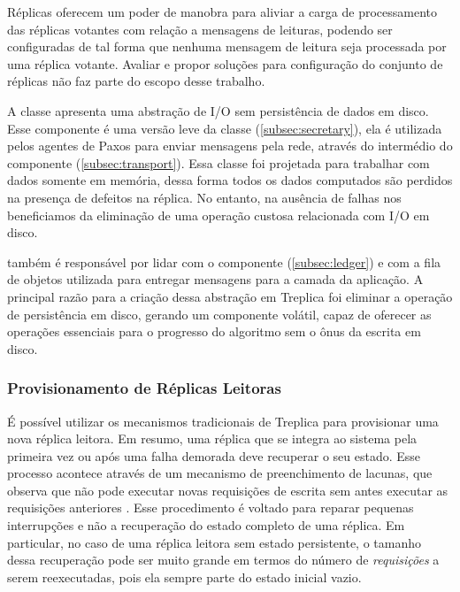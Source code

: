 Réplicas oferecem um poder de manobra para aliviar a carga de processamento das réplicas
votantes com relação a mensagens de leituras, podendo ser configuradas de tal forma que
nenhuma mensagem de leitura seja processada por uma réplica votante. Avaliar e propor
soluções para configuração do conjunto de réplicas não faz parte do escopo desse trabalho.


A classe  apresenta uma abstração de I/O sem persistência de
dados em disco. Esse componente é uma versão leve da classe 
(\autoref{subsec:secretary}), ela é utilizada pelos agentes de Paxos para enviar mensagens
pela rede, através do intermédio do componente 
(\autoref{subsec:transport}). Essa classe foi projetada para trabalhar com dados somente
em memória, dessa forma todos os dados computados são perdidos na presença de defeitos na
réplica. No entanto, na ausência de falhas nos beneficiamos da eliminação de uma operação
custosa relacionada com I/O em disco.

 também é responsável por lidar com o componente
 (\autoref{subsec:ledger}) e com a fila de objetos utilizada
para entregar mensagens para a camada da aplicação. A principal razão para a criação dessa
abstração em Treplica foi eliminar a operação de persistência em disco, gerando um
componente volátil, capaz de oferecer as operações essenciais para o progresso do
algoritmo sem o ônus da escrita em disco.

\subsubsection{Provisionamento de Réplicas Leitoras}

É possível utilizar os mecanismos tradicionais de Treplica para provisionar uma nova
réplica leitora. Em resumo, uma réplica que se integra ao sistema pela primeira vez ou
após uma falha demorada deve recuperar o seu estado. Esse processo acontece através de um
mecanismo de preenchimento de lacunas, que observa que não pode executar novas requisições
de escrita sem antes executar as requisições anteriores \cite{vieira-tr10b}. Esse
procedimento é voltado para reparar pequenas interrupções e não a recuperação do estado
completo de uma réplica. Em particular, no caso de uma réplica leitora sem estado
persistente, o tamanho dessa recuperação pode ser muito grande em termos do número de
\emph{requisições} a serem reexecutadas, pois ela sempre parte do estado inicial vazio.

